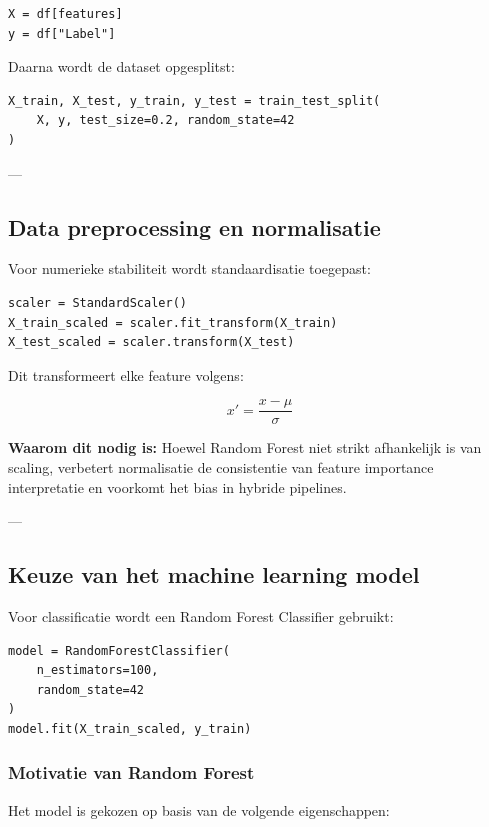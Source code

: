\begin{verbatim}
X = df[features]
y = df["Label"]
\end{verbatim}

Daarna wordt de dataset opgesplitst:

\begin{verbatim}
X_train, X_test, y_train, y_test = train_test_split(
    X, y, test_size=0.2, random_state=42
)
\end{verbatim}

---

\subsection{Data preprocessing en normalisatie}

Voor numerieke stabiliteit wordt standaardisatie toegepast:

\begin{verbatim}
scaler = StandardScaler()
X_train_scaled = scaler.fit_transform(X_train)
X_test_scaled = scaler.transform(X_test)
\end{verbatim}

Dit transformeert elke feature volgens:

\[
x' = \frac{x - \mu}{\sigma}
\]

\textbf{Waarom dit nodig is:}
Hoewel Random Forest niet strikt afhankelijk is van scaling, verbetert normalisatie de consistentie van feature importance interpretatie en voorkomt het bias in hybride pipelines.

---

\subsection{Keuze van het machine learning model}

Voor classificatie wordt een Random Forest Classifier gebruikt:

\begin{verbatim}
model = RandomForestClassifier(
    n_estimators=100,
    random_state=42
)
model.fit(X_train_scaled, y_train)
\end{verbatim}

\subsubsection{Motivatie van Random Forest}

Het model is gekozen op basis van de volgende eigenschappen:

